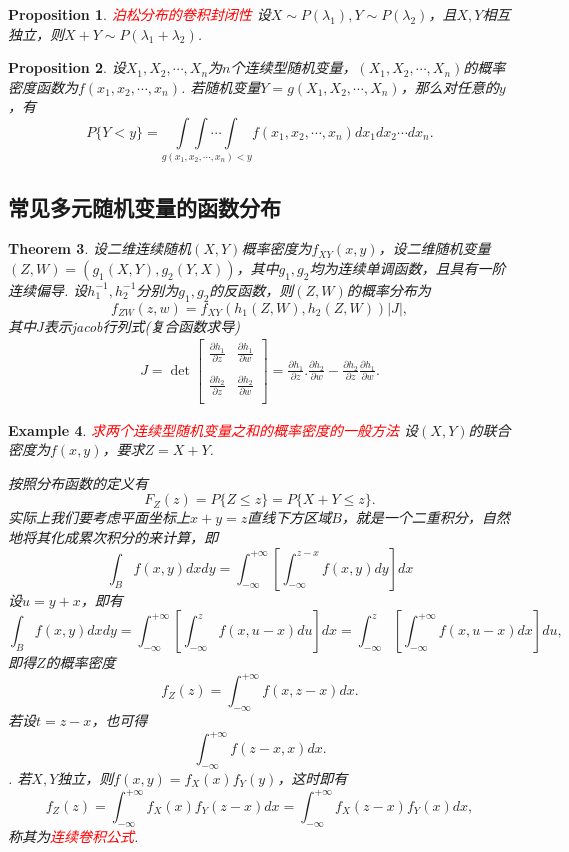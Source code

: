 \documentclass{article}
\newtheorem{theorem}{Theorem}[section]
\newtheorem{proposition}[theorem]{Proposition}
\newtheorem{example}[theorem]{Example}
\newcommand{\redt}[1]{\textcolor{red}{#1}}
\begin{document}
\begin{proposition}
\rm \redt{泊松分布的卷积封闭性} 设$X \sim P(\lambda_1),Y \sim P(\lambda_2)$，且$X,Y$相互独立，则$X+Y \sim P(\lambda_1 + \lambda_2)$. 
\end{proposition}

\begin{proposition}
\rm 设$X_1,X_2,\cdots,X_n$为$n$个连续型随机变量，$(X_1,X_2,\cdots,X_n)$的概率密度函数为$f(x_1,x_2,\cdots,x_n)$. 若随机变量$Y=g(X_1,X_2,\cdots,X_n)$，那么对任意的$y$，有
$$
P\{Y < y\} = \underset{g(x_1,x_2,\cdots,x_n) < y}{\int\int\cdots\int}f(x_1,x_2,\cdots,x_n)dx_1dx_2\cdots dx_n.
$$
\end{proposition}


\subsection{常见多元随机变量的函数分布}

\begin{theorem}
\rm 设二维连续随机$(X,Y)$概率密度为$f_{XY}(x,y)$，设二维随机变量$(Z,W) = (g_1(X,Y),g_2(Y,X))$，其中$g_1,g_2$均为连续单调函数，且具有一阶连续偏导. 设$h_1^{-1},h_2^{-1}$分别为$g_1,g_2$的反函数，则$(Z,W)$的概率分布为
$$
f_{ZW}(z,w) = f_{XY}(h_1(Z,W),h_2(Z,W))|J|,
$$
其中$J$表示jacob行列式(复合函数求导)
\begin{align}
  \nonumber J=   \det  \begin{bmatrix}
                        \frac{\partial h_1}{\partial z} & \frac{\partial h_1}{\partial w}  \\
                         &  \\
                        \frac{\partial h_2}{\partial z}  & \frac{\partial h_2}{\partial w}  \\
                      \end{bmatrix}
                      =\frac{\partial h_1}{\partial z}.\frac{\partial h_2}{\partial w}-\frac{\partial h_2}{\partial z}\frac{\partial h_1}{\partial w}.
\end{align}
\end{theorem}

\begin{example}
\rm \redt{求两个连续型随机变量之和的概率密度的一般方法} 设$(X,Y)$的联合密度为$f(x,y)$，要求$Z=X+Y$.

按照分布函数的定义有
$$
F_Z(z)=P\{Z \leq z\} = P\{X+Y \leq z\}.
$$
实际上我们要考虑平面坐标上$x+y=z$直线下方区域$B$，就是一个二重积分，自然地将其化成累次积分的来计算，即
$$
\int_{B} f(x,y)dxdy = \int_{-\infty}^{+\infty}\left[ \int_{-\infty}^{z-x} f(x,y)dy \right] dx
$$
设$u = y+x$，即有
$$
\int_{B} f(x,y)dxdy = \int_{-\infty}^{+\infty}\left[ \int_{-\infty}^{z} f(x,u-x)du \right] dx = \int_{-\infty}^{z} \left[ \int_{-\infty}^{+\infty} f(x,u-x)dx \right] du, 
$$
即得$Z$的概率密度
$$
f_Z(z) = \int_{-\infty}^{+\infty} f(x,z-x)dx.
$$
若设$t=z-x$，也可得
$$
\int_{-\infty}^{+\infty} f(z-x,x)dx.
$$.
若$X,Y$独立，则$f(x,y)=f_X(x)f_Y(y)$，这时即有
$$
f_Z(z) = \int_{-\infty}^{+\infty} f_X(x)f_Y(z-x)dx = \int_{-\infty}^{+\infty} f_X(z-x)f_Y(x)dx,
$$
称其为\redt{连续卷积公式}. 
\end{example}
\end{document}
